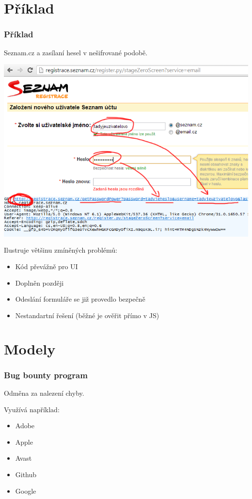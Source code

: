 \documentclass[xetex]{beamer}
\begin{document}
\section{Příklad}
\begin{frame}
	\frametitle{Příklad}

	Seznam.cz a zasílaní hesel v nešifrované podobě.

	\includegraphics[scale=0.3]{pic/seznam.png}
\end{frame}

\begin{frame}
	Ilustruje většinu zmíněných problémů:
	\begin{itemize}
		\item Kód převážně pro UI
		\item Doplněn později
		\item Odeslání formuláře se již provedlo bezpečně
		\item Nestandartní řešení (běžné je ověřit přímo v JS)
	\end{itemize}
\end{frame}

\section{Modely}

\begin{frame}
	\frametitle{Bug bounty program}
	Odměna za nalezení chyby.

	\medskip

	Využívá například:
	\begin{itemize}
		\item Adobe
		\item Apple
		\item Avast
		\item Github
		\item Google
	\end{itemize}
\end{frame}
\end{document}
